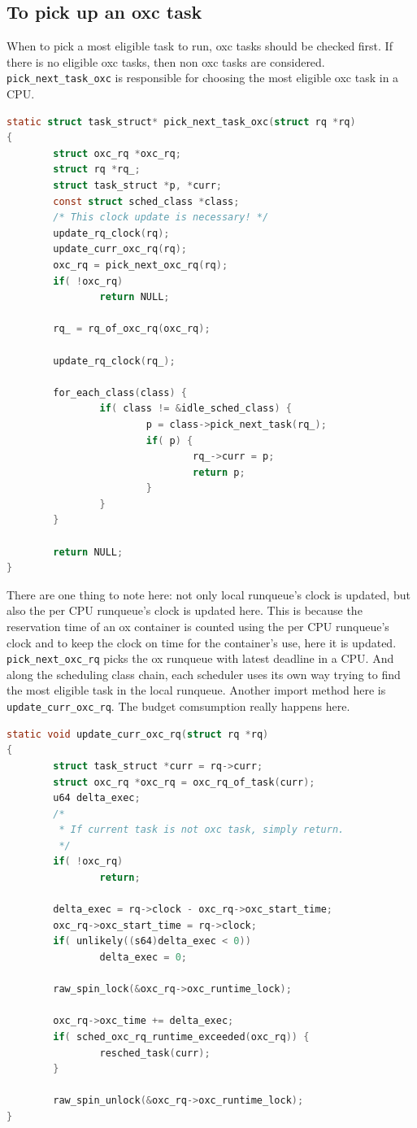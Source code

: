 \subsection{To pick up an oxc task}
When to pick a most eligible task to run, oxc tasks should be checked first.
If there is no eligible oxc tasks, then non oxc tasks are considered.
\texttt{pick\_next\_task\_oxc} is responsible for choosing the most 
eligible oxc task in a CPU.
\begin{lstlisting}[language=C, label={list:pick_next}]
static struct task_struct* pick_next_task_oxc(struct rq *rq)
{
        struct oxc_rq *oxc_rq;
        struct rq *rq_;
        struct task_struct *p, *curr;
        const struct sched_class *class;
        /* This clock update is necessary! */
        update_rq_clock(rq);
        update_curr_oxc_rq(rq);
        oxc_rq = pick_next_oxc_rq(rq);
        if( !oxc_rq)
                return NULL;

        rq_ = rq_of_oxc_rq(oxc_rq);

        update_rq_clock(rq_);

        for_each_class(class) {
                if( class != &idle_sched_class) {
                        p = class->pick_next_task(rq_);
                        if( p) {
                                rq_->curr = p;
                                return p;
                        }
                }
        }

        return NULL;
}
\end{lstlisting}
There are one thing to note here: not only local runqueue's clock
is updated, but also the per CPU runqueue's clock is updated here.
This is because the reservation time of an ox container is counted
using the per CPU runqueue's clock and to keep the clock on time
for the container's use, here it is updated. 
\texttt{pick\_next\_oxc\_rq} picks the ox runqueue with latest 
deadline in a CPU. And along the scheduling class chain, each
scheduler uses its own way trying to find the most eligible
task in the local runqueue.
Another import method here is \texttt{update\_curr\_oxc\_rq}.
The budget comsumption really happens here.
\begin{lstlisting}[language=C]
static void update_curr_oxc_rq(struct rq *rq)
{
        struct task_struct *curr = rq->curr;
        struct oxc_rq *oxc_rq = oxc_rq_of_task(curr);
        u64 delta_exec;
        /*
         * If current task is not oxc task, simply return.
         */
        if( !oxc_rq)
                return;

        delta_exec = rq->clock - oxc_rq->oxc_start_time;
        oxc_rq->oxc_start_time = rq->clock;
        if( unlikely((s64)delta_exec < 0))
                delta_exec = 0;

        raw_spin_lock(&oxc_rq->oxc_runtime_lock);

        oxc_rq->oxc_time += delta_exec;
        if( sched_oxc_rq_runtime_exceeded(oxc_rq)) {
                resched_task(curr);
        }

        raw_spin_unlock(&oxc_rq->oxc_runtime_lock);
}
\end{lstlisting}

